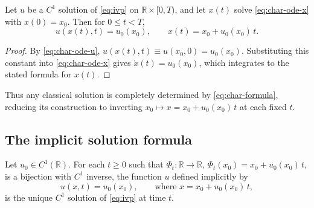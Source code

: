 \begin{proposition}
\label{prop:char-lines}
Let $u$ be a $C^1$ solution of \eqref{eq:ivp} on $\mathbb{R} \times
[0,T)$, and let $x(t)$ solve \eqref{eq:char-ode-x} with $x(0)=x_0$. Then
for $0 \le t < T$,
\begin{equation}
  \label{eq:char-formula}
  u(x(t), t) = u_0(x_0), \qquad x(t) = x_0 + u_0(x_0)\, t.
\end{equation}
\end{proposition}

\begin{proof}
By \eqref{eq:char-ode-u}, $u(x(t),t) \equiv u(x_0,0) = u_0(x_0)$.
Substituting this constant into \eqref{eq:char-ode-x} gives $\dot x(t) =
u_0(x_0)$, which integrates to the stated formula for $x(t)$.
\end{proof}

Thus any classical solution is completely determined by
\eqref{eq:char-formula}, reducing its construction to inverting $x_0
\mapsto x = x_0 + u_0(x_0)\, t$ at each fixed $t$.

\subsection{The implicit solution formula}
\label{subsec:char-implicit-formula}

\begin{theorem}
\label{thm:implicit-solution}
Let $u_0 \in C^1(\mathbb{R})$. For each $t \geq 0$ such that $\Phi_t :
\mathbb{R} \to \mathbb{R}$, $\Phi_t(x_0) = x_0 + u_0(x_0)\, t$, is a
bijection with $C^1$ inverse, the function $u$ defined implicitly by
\begin{equation}
  \label{eq:implicit-solution}
  u(x,t) = u_0(x_0), \qquad \text{where } x = x_0 + u_0(x_0)\, t,
\end{equation}
is the unique $C^1$ solution of \eqref{eq:ivp} at time $t$.
\end{theorem}

